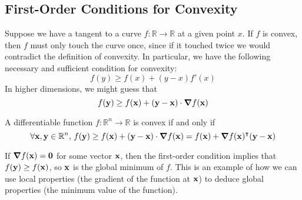 \subsection{First-Order Conditions for Convexity}
Suppose we have a tangent to a curve \(f \colon \mathbb R \to \mathbb R\) at a given point \(x\).
If \(f\) is convex, then \(f\) must only touch the curve once, since if it touched twice we would contradict the definition of convexity.
In particular, we have the following necessary and sufficient condition for convexity:
\[
	f(y) \geq f(x) + (y - x)f'(x)
\]
In higher dimensions, we might guess that
\[
	f(\vb y) \geq f(\vb x) + (\vb y - \vb x) \cdot \grad{f(\vb x)}
\]
\begin{theorem}
	A differentiable function \(f \colon \mathbb R^n \to \mathbb R\) is convex if and only if
	\[
		\forall \vb x, \vb y \in \mathbb R^n,\, f(\vb y) \geq f(\vb x) + (\vb y - \vb x) \cdot \grad{f(\vb x)} = f(\vb x) + \grad{f(\vb x)}^\intercal (\vb y - \vb x)
	\]
\end{theorem}
\begin{remark}
	If \(\grad{f(\vb x)} = \vb 0\) for some vector \(\vb x\), then the first-order condition implies that \(f(\vb y) \geq f(\vb x)\), so \(\vb x\) is the global minimum of \(f\).
	This is an example of how we can use local properties (the gradient of the function at \(\vb x\)) to deduce global properties (the minimum value of the function).
\end{remark}
